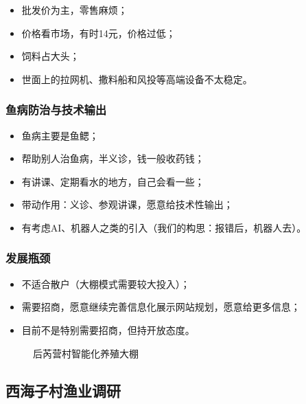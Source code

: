 \documentclass[12pt,a4paper]{article}
\begin{document}
\begin{itemize}[leftmargin=2em]
    \item 批发价为主，零售麻烦；
    \item 价格看市场，有时14元，价格过低；
    \item 饲料占大头；
    \item 世面上的拉网机、撒料船和风投等高端设备不太稳定。
\end{itemize}

\subsubsection{鱼病防治与技术输出}

\begin{itemize}[leftmargin=2em]
    \item 鱼病主要是鱼鳃；
    \item 帮助别人治鱼病，半义诊，钱一般收药钱；
    \item 有讲课、定期看水的地方，自己会看一些；
    \item 带动作用：义诊、参观讲课，愿意给技术性输出；
    \item 有考虑AI、机器人之类的引入（我们的构思：报错后，机器人去）。
\end{itemize}

\subsubsection{发展瓶颈}

\begin{itemize}[leftmargin=2em]
    \item 不适合散户（大棚模式需要较大投入）；
    \item 需要招商，愿意继续完善信息化展示网站规划，愿意给更多信息；
    \item 目前不是特别需要招商，但持开放态度。
\end{itemize}

\begin{figure}[H]
\centering
{}
\caption{后芮营村智能化养殖大棚}
\end{figure}

\subsection{西海子村渔业调研}
\end{document}
